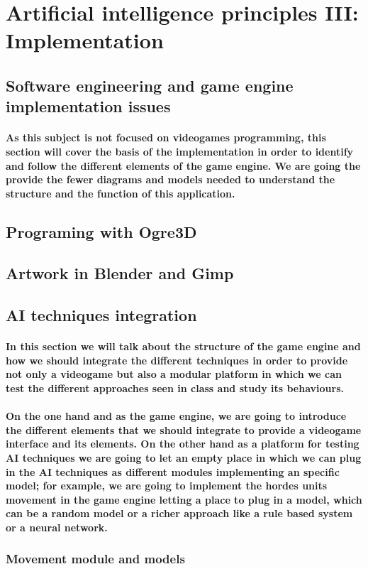 \documentclass[a4paper,10pt]{article}
\newcommand{\p}[1]{\paragraph{\indent\textnormal{#1}}}
\begin{document}
\newpage
\section{Artificial intelligence principles III: Implementation}

  \subsection{Software engineering and game engine implementation issues}

    \p{As this subject is not focused on videogames programming, this section will cover the basis of the implementation in order to identify and follow the different elements of the game engine. We are going the provide the fewer diagrams and models needed to understand the structure and the function of this application.}


  \subsection{Programing with Ogre3D}

  \subsection{Artwork in Blender and Gimp}


  \subsection{AI techniques integration}

  \p{In this section we will talk about the structure of the game engine and how we should integrate the different techniques in order to provide not only a videogame but also a modular platform in which we can test the different approaches seen in class and study its behaviours.}

  \p{On the one hand and as the game engine, we are going to introduce the different elements that we should integrate to provide a videogame interface and its elements. On the other hand as a platform for testing AI techniques we are going to let an empty place in which we can plug in the AI techniques as different modules implementing an specific model; for example, we are going to implement the hordes units movement in the game engine letting a place to plug in a model, which can be a random model or a richer approach like a rule based system or a neural network.}
  
  \subsubsection{Movement module and models}
    
\end{document}
